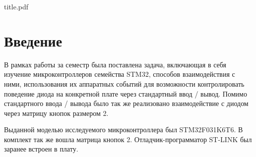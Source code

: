 

\def\oldbibitem{}
\let\oldbibitem=\bibitem
\def\bibitem{\stepcounter{citenum}\oldbibitem}



{title.pdf}

\tableofcontents
\newpage

\section{Введение}
В рамках работы за семестр была поставлена задача, включающая в себя изучение микроконтроллеров семейства STM32,
способов взаимодействия с ними, использования их аппаратных событий для возможности контролировать поведение
диода на конкретной плате через стандартный ввод / вывод. Помимо стандартного ввода / вывода было так же реализовано 
взаимодействие с диодом через матрицу кнопок размером 2.

Выданной моделью исследуемого микроконтроллера был STM32F031K6T6. В комплект так же вошла матрица кнопок 2.
Отладчик-программатор ST-LINK был заранее встроен в плату.
\begin{thebibliography}{}


\end{thebibliography}


